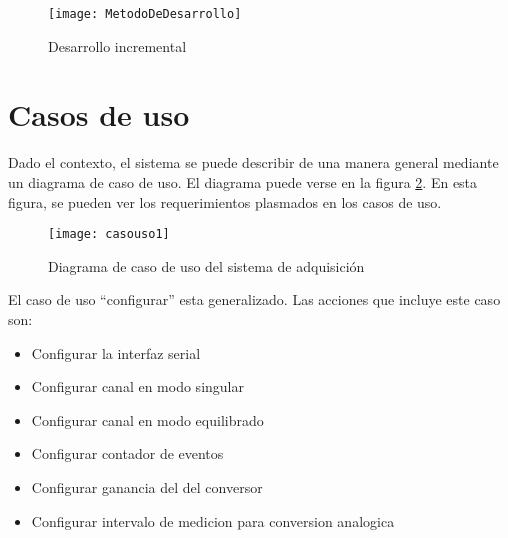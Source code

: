 \begin{figure}[h]
  \centering
  \texttt{[image: MetodoDeDesarrollo]}
  \caption{Desarrollo incremental}\label{fig:MetodoDeDesarrollo}
\end{figure}


\section{Casos de uso} %
\label{sec:casos_de_uso}

Dado el contexto, el sistema se puede describir de una manera general mediante un diagrama de caso de uso. El diagrama puede verse en la figura \ref{fig:casouso1}. En esta figura, se pueden ver los requerimientos plasmados en los casos de uso.

\begin{figure}[h]
  \centering
  \texttt{[image: casouso1]}
  \caption{Diagrama de caso de uso del sistema de adquisición}\label{fig:casouso1}
\end{figure}

El caso de uso ``configurar'' esta generalizado. Las acciones que incluye este caso son:
\begin{itemize}
	\item Configurar la interfaz serial
	\item Configurar canal en modo singular
	\item Configurar canal en modo equilibrado
	\item Configurar contador de eventos
	\item Configurar ganancia del del conversor
	\item Configurar intervalo de medicion para conversion analogica
\end{itemize}


